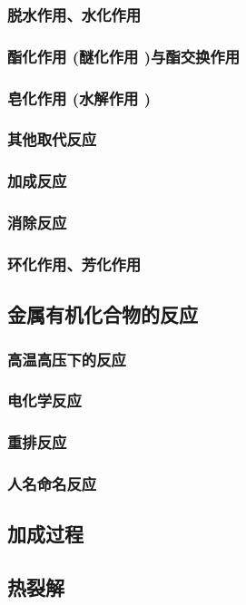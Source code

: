 \documentclass[UTF8]{../03-Chemistry}
\begin{document}
        \subsubsection{脱水作用、水化作用}
        \subsubsection{酯化作用 (醚化作用 )与酯交换作用}
        \subsubsection{皂化作用 (水解作用 )}
        \subsubsection{其他取代反应}
        \subsubsection{加成反应}
        \subsubsection{消除反应}
        \subsubsection{环化作用、芳化作用}
    \subsection{金属有机化合物的反应}
        \subsubsection{高温高压下的反应}
        \subsubsection{电化学反应}
        \subsubsection{重排反应}
        \subsubsection{人名命名反应}
    \subsection{加成过程}
    \subsection{热裂解}
\end{document}
